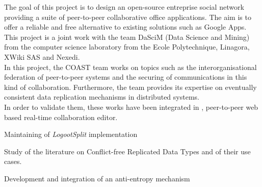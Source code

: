 \documentclass[]{deedy-resume-openfont}
\begin{document}
\sectionsep

\hfill\begin{minipage}{\dimexpr\textwidth-0.5cm}
The goal of this project is to design an open-source entreprise social network providing a suite of
peer-to-peer collaborative office applications.
The aim is to offer a reliable and free alternative to existing solutions such as Google Apps.
This project is a joint work with the team DaSciM (Data Science and Mining) from the
computer science laboratory from the Ecole Polytechnique, Linagora, XWiki SAS and Nexedi.
\\
In this project, the COAST team works on topics such as the interorganisational federation of
peer-to-peer systems and the securing of communications in this kind of collaboration.
Furthermore, the team provides its expertise
on eventually consistent data replication mechanisms in distributed systems.
\\
In order to validate them, these works have been integrated in \href{https://www.coedit.re}{},
peer-to-peer web based real-time collaboration editor.
\begin{tightemize}
\item Maintaining of \emph{LogootSplit}\citep{sp2-l2-9}\citep{sp2-l2-10} implementation
\item Study of the literature on Conflict-free Replicated Data Types and of their use cases.
\item Development and integration of an anti-entropy mechanism\citep{sp2-l2-2}
\end{tightemize}
\sectionsep
\end{minipage}

\hfill\begin{minipage}{\dimexpr\textwidth-0.5cm}
\renewcommand\refname{\vskip -20pt} %


\nocite{*}
\end{minipage}
\end{document}
